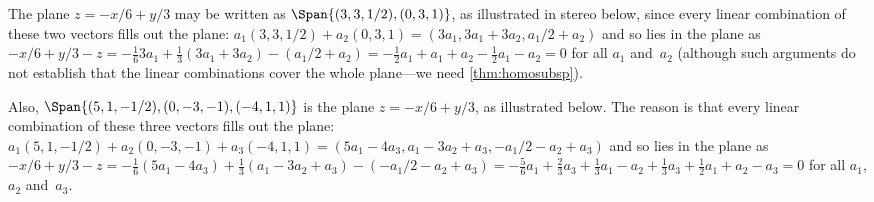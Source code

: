 \begin{example} \label{eg:plsubs}
The plane \(z=-x/6+y/3\) may be written as \(\Span\{(3,3,1/2),(0,3,1)\}\), as illustrated in stereo below, since every linear combination of these two vectors fills out the plane: \(a_1(3,3,1/2)+a_2(0,3,1) =(3a_1,3a_1+3a_2,a_1/2+a_2)\) and so lies in the plane as \(-x/6+y/3-z=-\frac163a_1+\frac13(3a_1+3a_2)-(a_1/2+a_2) =-\frac12a_1+a_1+a_2-\frac12a_1-a_2=0\) for all \(a_1\) and~\(a_2\) (although such arguments do not establish that the linear combinations cover the whole plane---we need \autoref{thm:homosubsp}).
\begin{center}
 {}
\end{center}

Also,  \(\Span\{(5,1,-1/2),(0,-3,-1),(-4,1,1)\}\) is the  plane \(z=-x/6+y/3\), as illustrated below. 
The reason is that every linear combination of these three vectors fills out the plane: \(a_1(5,1,-1/2)+a_2(0,-3,-1)+a_3(-4,1,1) =(5a_1-4a_3, a_1-3a_2+a_3, -a_1/2-a_2+a_3)\) and so lies in the plane as \(-x/6+y/3-z=-\frac16(5a_1-4a_3)+\frac13(a_1-3a_2+a_3)-(-a_1/2-a_2+a_3) =-\frac56a_1+\frac23a_3+\frac13a_1-a_2+\frac13a_3+\frac12a_1+a_2-a_3 =0\) for all \(a_1\), \(a_2\) and~\(a_3\).
\begin{center}
 {}
\end{center}
\end{example}

